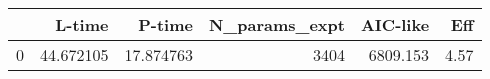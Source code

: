 \begin{tabular}{lrrrrr}
\toprule
{} &     L-time &     P-time &  N\_params\_expt &  AIC-like &   Eff \\
\midrule
0 &  44.672105 &  17.874763 &           3404 &  6809.153 &  4.57 \\
\bottomrule
\end{tabular}
